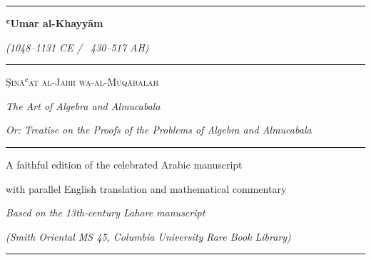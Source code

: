 \begin{titlepage}

\begin{center}

\vspace*{1.5cm}
{
\color{titlecolor}
\rule{\textwidth}{1.5pt}}

\vspace{1cm}

{\Huge\bfseries
\color{titlecolor} ʿUmar al-Khayyām}

\vspace{0.5cm}

{\Large\itshape (1048--1131 CE / ~430--517 AH)}

\vspace{1.5cm}

{
\color{titlecolor}
\rule{0.7\textwidth}{0.8pt}}

\vspace{1.5cm}

\begin{Arabic}

{
}

\end{Arabic}

\vspace{0.8cm}

{\LARGE\scshape Ṣināʿat al-Jabr wa-al-Muqābalah}

\vspace{0.3cm}

{\large
\textit{The Art of Algebra and Almucabala}}

\vspace{0.3cm}

{\normalsize
\textit{Or: Treatise on the Proofs of the Problems of Algebra and Almucabala}}

\vspace{1.5cm}

{
\color{titlecolor}
\rule{0.7\textwidth}{0.8pt}}

\vspace{1cm}

{\large A faithful edition of the celebrated Arabic manuscript}

\vspace{0.3cm}

{\normalsize with parallel English translation and mathematical commentary}

\vspace{2cm}

{\small
\textit{Based on the 13th-century Lahore manuscript}}

\vspace{0.2cm}

{\small
\textit{(Smith Oriental MS 45, Columbia University Rare Book Library)}}

\vspace{1cm}

{
\color{titlecolor}
\rule{\textwidth}{1.5pt}}

\end{center}

\end{titlepage}

